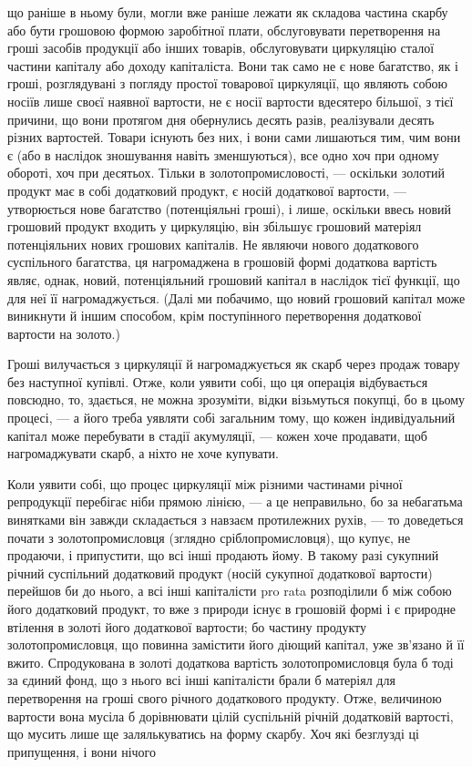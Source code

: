 \parcont{}  %
що раніше в ньому були, могли вже раніше лежати як складова частина
скарбу або бути грошовою формою заробітної плати, обслуговувати
перетворення на гроші засобів продукції або інших товарів, обслуговувати
циркуляцію сталої частини капіталу або доходу капіталіста. Вони
так само не є нове багатство, як і гроші, розглядувані з погляду простої
товарової циркуляції, що являють собою носіїв лише своєї наявної
вартости, не є носії вартости вдесятеро більшої, з тієї причини, що
вони протягом дня обернулись десять разів, реалізували десять різних
вартостей. Товари існують без них, і вони сами лишаються тим, чим
вони є (або в наслідок зношування навіть зменшуються), все одно хоч
при одному обороті, хоч при десятьох. Тільки в золотопромисловості, —
оскільки золотий продукт має в собі додатковий продукт, є носій додаткової
вартости, — утворюється нове багатство (потенціяльні гроші), і
лише, оскільки ввесь новий грошовий продукт входить у циркуляцію,
він збільшує грошовий матеріял потенціяльних нових грошових капіталів.
Не являючи нового додаткового суспільного багатства, ця нагромаджена
в грошовій формі додаткова вартість являє, однак, новий, потенціяльний
грошовий капітал в наслідок тієї функції, що для неї її нагромаджується.
(Далі ми побачимо, що новий грошовий капітал може виникнути
й іншим способом, крім поступінного перетворення додаткової вартости
на золото.)

Гроші вилучається з циркуляції й нагромаджується як скарб через
продаж товару без наступної купівлі. Отже, коли уявити собі, що ця
операція відбувається повсюдно, то, здається, не можна зрозуміти, відки
візьмуться покупці, бо в цьому процесі, — а його треба уявляти собі загальним
тому, що кожен індивідуальний капітал може перебувати в стадії
акумуляції, — кожен хоче продавати, щоб нагромаджувати скарб, а ніхто
не хоче купувати.

Коли уявити собі, що процес циркуляції між різними частинами річної
репродукції перебігає ніби прямою лінією, — а це неправильно, бо за
небагатьма винятками він завжди складається з навзаєм протилежних
рухів, — то доведеться почати з золотопромисловця (зглядно сріблопромисловця),
що купує, не продаючи, і припустити, що всі інші продають
йому. В такому разі сукупний річний суспільний додатковий продукт
(носій сукупної додаткової вартости) перейшов би до нього,
а всі інші капіталісти pro rata розподілили б між собою його
додатковий продукт, то вже з природи існує в грошовій формі і є природне
втілення в золоті його додаткової вартости; бо частину продукту
золотопромисловця, що повинна замістити його діющий капітал, уже зв’язано
й її вжито. Спродукована в золоті додаткова вартість золотопромисловця
була б тоді за єдиний фонд, що з нього всі інші капіталісти
брали б матеріял для перетворення на гроші свого річного додаткового
продукту. Отже, величиною вартости вона мусіла б дорівнювати цілій
суспільній річній додатковій вартості, що мусить лише ще залялькуватись
на форму скарбу. Хоч які безглузді ці припущення, і вони нічого
\parbreak{}  %

